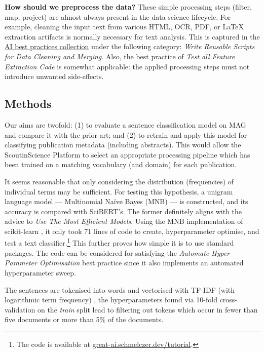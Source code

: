 \begin{displayquote}
\textbf{How should we preprocess the data?} These simple processing steps (filter, map, project) are almost always present in the data science lifecycle. For example, cleaning the input text from various HTML, OCR, PDF, or \LaTeX \hskip 0.12cm extraction artifacts is normally necessary for text analysis. This is captured in the \href{https://se-ml.github.io/practices}{AI best practices collection} under the following category: \textit{Write Reusable Scripts for Data Cleaning and Merging}. Also, the best practice of \textit{Test all Feature Extraction Code} is somewhat applicable: the applied processing steps must not introduce unwanted side-effects.
\end{displayquote}

\subsection{Methods}

Our aims are twofold: (1) to evaluate a sentence classification model on MAG and compare it with the prior art; and (2) to retrain and apply this model for classifying publication metadata (including abstracts). This would allow the ScoutinScience Platform to select an appropriate processing pipeline which has been trained on a matching vocabulary (and domain) for each publication. 

It seems reasonable that only considering the distribution (frequencies) of individual terms may be sufficient. For testing this hypothesis, a unigram language model --- Multinomial Naïve Bayes (MNB) --- is constructed, and its accuracy is compared with SciBERT's. The former definitely aligns with the advice to \textit{Use The Most Efficient Models}. Using the MNB implementation of scikit-learn \cite{pedregosa2011scikit}, it only took 71 lines of code to create, hyperparameter optimise, and test a text classifier.\footnote{The code is available at \href{https://great-ai.schmelczer.dev/tutorial/}{great-ai.schmelczer.dev/tutorial}.} This further proves how simple it is to use standard packages. The code can be considered for satisfying the \textit{Automate Hyper-Parameter Optimisation} best practice since it also implements an automated hyperparameter sweep.

The sentences are tokenised into words and vectorised with TF-IDF (with logarithmic term frequency) \cite{buckley1985implementation}, the hyperparameters found via 10-fold cross-validation on the \textit{train} split lead to filtering out tokens which occur in fewer than five documents or more than 5\% of the documents.

